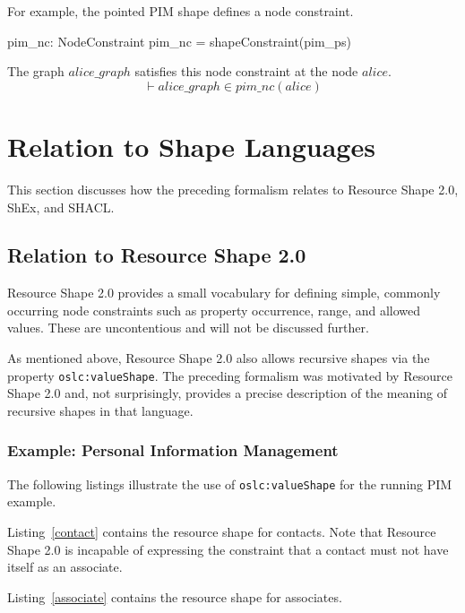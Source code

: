 \documentclass{article}
\begin{document}
For example, the pointed PIM shape defines a node constraint.
\begin{axdef}
	pim\_nc: NodeConstraint
\where
	pim\_nc = shapeConstraint(pim\_ps)
\end{axdef}

The graph $alice\_graph$ satisfies this node constraint at the node $alice$.
\[\vdash
	alice\_graph \in pim\_nc(alice)
\]

\section{Relation to Shape Languages}
\label{sec-languages}

This section discusses how the preceding formalism relates to Resource Shape 2.0, ShEx, and SHACL.

\subsection{Relation to Resource Shape 2.0}

Resource Shape 2.0 provides a small vocabulary for defining simple, commonly occurring node constraints
such as property occurrence, range, and allowed values. These are uncontentious and will not be discussed further.

As mentioned above, Resource Shape 2.0 also allows recursive shapes via the property {\tt oslc:valueShape}.
The preceding formalism was motivated by Resource Shape 2.0 and, not surprisingly, provides a precise
description of the meaning of recursive shapes in that language.

\subsubsection{Example: Personal Information Management}
The following listings illustrate the use of {\tt oslc:valueShape} for the running PIM example.

Listing~\ref{contact} contains the resource shape for contacts.
\cbstart
Note that Resource Shape 2.0 is incapable of expressing the constraint that a contact must not have itself as an associate.
\cbend


Listing~\ref{associate} contains the resource shape for associates.

\end{document}
